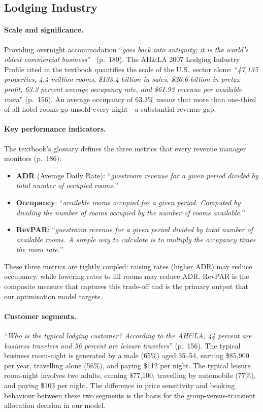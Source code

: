 \subsection{Lodging Industry}

\paragraph{Scale and significance.}
Providing overnight accommodation ``\emph{goes back into antiquity; it is the world's oldest commercial business}''~\cite{goeldner2009} (p.~180). The AH\&LA 2007 Lodging Industry Profile cited in the textbook quantifies the scale of the U.S.~sector alone: ``\emph{47{,}135 properties, 4.4 million rooms, \$133.4 billion in sales, \$26.6 billion in pretax profit, 63.3 percent average occupancy rate, and \$61.93 revenue per available room}'' (p.~156). An average occupancy of 63.3\% means that more than one-third of all hotel rooms go unsold every night---a substantial revenue gap.

\paragraph{Key performance indicators.}
The textbook's glossary defines the three metrics that every revenue manager monitors (p.~186):
\begin{itemize}
  \item \textbf{ADR} (Average Daily Rate): ``\emph{guestroom revenue for a given period divided by total number of occupied rooms.}''
  \item \textbf{Occupancy}: ``\emph{available rooms occupied for a given period. Computed by dividing the number of rooms occupied by the number of rooms available.}''
  \item \textbf{RevPAR}: ``\emph{guestroom revenue for a given period divided by total number of available rooms. A simple way to calculate is to multiply the occupancy times the room rate.}''
\end{itemize}
These three metrics are tightly coupled: raising rates (higher ADR) may reduce occupancy, while lowering rates to fill rooms may reduce ADR. RevPAR is the composite measure that captures this trade-off and is the primary output that our optimisation model targets.

\paragraph{Customer segments.}
``\emph{Who is the typical lodging customer? According to the AH\&LA, 44 percent are business travelers and 56 percent are leisure travelers}'' (p.~156). The typical business room-night is generated by a male (65\%) aged 35--54, earning \$85{,}900 per year, travelling alone (56\%), and paying \$112 per night. The typical leisure room-night involves two adults, earning \$77{,}100, travelling by automobile (77\%), and paying \$103 per night. The difference in price sensitivity and booking behaviour between these two segments is the basis for the group-versus-transient allocation decision in our model.


